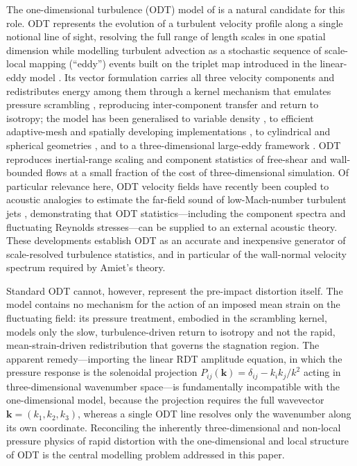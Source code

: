 \documentclass[lineno]{JFM-FLM_Au}
\begin{document}
The one-dimensional turbulence (ODT) model of \citet{Kerstein1999} is a
natural candidate for this role. ODT represents the evolution of a
turbulent velocity profile along a single notional line of sight,
resolving the full range of length scales in one spatial dimension while
modelling turbulent advection as a stochastic sequence of scale-local
mapping (``eddy'') events built on the triplet map introduced in the
linear-eddy model \citep{Kerstein1991}. Its vector formulation
\citep{Kerstein2001} carries all three velocity components and
redistributes energy among them through a kernel mechanism that emulates
pressure scrambling \citep{WunschKerstein2001,Kerstein2001}, reproducing
inter-component transfer and return to isotropy; the model has been generalised to variable density
\citep{AshurstKerstein2005}, to efficient adaptive-mesh and spatially
developing implementations \citep{Lignell2013,StephensLignell2021}, to
cylindrical and spherical geometries \citep{Lignell2018}, and to a
three-dimensional large-eddy framework \citep{SchmidtKerstein2010}. ODT
reproduces inertial-range scaling and component statistics of free-shear
and wall-bounded flows at a small fraction of the cost of
three-dimensional simulation. Of particular relevance here, ODT velocity
fields have recently been coupled to acoustic analogies to estimate the
far-field sound of low-Mach-number turbulent jets
\citep{SharmaKleinSchmidt2022,MedinaMendez2023}, demonstrating that ODT
statistics---including the component spectra and fluctuating Reynolds
stresses---can be supplied to an external acoustic theory. These
developments establish ODT as an accurate and inexpensive generator of
scale-resolved turbulence statistics, and in particular of the
wall-normal velocity spectrum required by Amiet's theory.

Standard ODT cannot, however, represent the pre-impact distortion itself.
The model contains no mechanism for the action of an imposed mean strain
on the fluctuating field: its pressure treatment, embodied in the
scrambling kernel, models only the slow, turbulence-driven return to
isotropy and not the rapid, mean-strain-driven redistribution that governs
the stagnation region. The apparent remedy---importing the linear RDT
amplitude equation, in which the pressure response is the solenoidal
projection $P_{ij}(\boldsymbol{k}) = \delta_{ij} - k_i k_j/k^2$ acting in
three-dimensional wavenumber space---is fundamentally incompatible with
the one-dimensional model, because the projection requires the full
wavevector $\boldsymbol{k}=(k_1,k_2,k_3)$, whereas a single ODT line
resolves only the wavenumber along its own coordinate. Reconciling the
inherently three-dimensional and non-local pressure physics of rapid
distortion with the one-dimensional and local structure of ODT is the
central modelling problem addressed in this paper.
\end{document}
